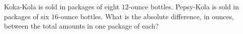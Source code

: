 Koka-Kola is sold in packages of eight $12$-ounce bottles. Pepsy-Kola is sold in packages of six $16$-ounce bottles. What is the absolute difference, in ounces, between the total amounts in one package of each?

